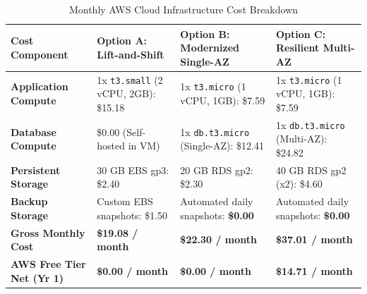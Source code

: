 \documentclass[11pt,a4paper]{article}
\begin{document}
\begin{table}[htbp]
\centering
\small
\caption{Monthly AWS Cloud Infrastructure Cost Breakdown}
\label{tab:aws_costs}
\begin{tabularx}{\textwidth}{p{4.2cm}X X X}
\toprule
\textbf{Cost Component} & \textbf{Option A: Lift-and-Shift} & \textbf{Option B: Modernized Single-AZ} & \textbf{Option C: Resilient Multi-AZ} \\
\midrule
\textbf{Application Compute} & 1x \texttt{t3.small} (2 vCPU, 2GB): \$15.18 & 1x \texttt{t3.micro} (1 vCPU, 1GB): \$7.59 & 1x \texttt{t3.micro} (1 vCPU, 1GB): \$7.59 \\
\textbf{Database Compute} & \$0.00 (Self-hosted in VM) & 1x \texttt{db.t3.micro} (Single-AZ): \$12.41 & 1x \texttt{db.t3.micro} (Multi-AZ): \$24.82 \\
\textbf{Persistent Storage} & 30 GB EBS gp3: \$2.40 & 20 GB RDS gp2: \$2.30 & 40 GB RDS gp2 (x2): \$4.60 \\
\textbf{Backup Storage} & Custom EBS snapshots: \$1.50 & Automated daily snapshots: \textbf{\$0.00} & Automated daily snapshots: \textbf{\$0.00} \\
\midrule
\textbf{Gross Monthly Cost} & \textbf{\$19.08 / month} & \textbf{\$22.30 / month} & \textbf{\$37.01 / month} \\
\textbf{AWS Free Tier Net (Yr 1)} & \textbf{\$0.00 / month} & \textbf{\$0.00 / month} & \textbf{\$14.71 / month} \\
\bottomrule
\end{tabularx}
\end{table}
\end{document}
